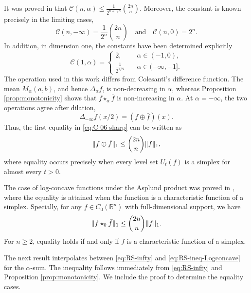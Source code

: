 \documentclass[11pt]{amsart}
\newcommand{\R}{{\mathbb R}}
\theoremstyle{plain}
\theoremstyle{definition}
\theoremstyle{remark}
\begin{document}
It was proved in  \cite{C-06} that
    $\mathcal{C} (n,\alpha) \leq \frac{1}{2^{n+1 / \alpha}}\binom{2 n}{n}.$
Moreover, the constant is known precisely in the limiting cases,
\begin{equation}
\label{eq:C-06-sharp}
\mathcal{C} (n,-\infty) = \frac{1}{2^n} \binom{2n}{n}\quad \text{and} \quad
\mathcal{C} (n,0) = 2^n.
\end{equation}
In addition, in dimension one, the constants have been determined explicitly
$$
   \mathcal{C} (1, \alpha)=
    \begin{cases}
        2,  & \quad \alpha \in(-1,0),
        \\
        \frac{1}{2^{1 / \alpha}} & \quad \alpha \in(-\infty,-1] .
    \end{cases}
$$
The operation used in this work differs from Colesanti's difference function. The mean $M_\alpha(a, b)$, and hence $\Delta_\alpha f$, is non-decreasing in $\alpha$, whereas Proposition \ref{prop:monotonicity} shows that $f \star_\alpha \bar f$ is non-increasing in $\alpha$. At $\alpha=-\infty$, the two operations agree after dilation,
$$
\Delta_{-\infty} f(x / 2)=(f \oplus \bar{f})(x) .
$$
Thus, the first equality in \eqref{eq:C-06-sharp} can be written as
\begin{equation}
    \label{eq:RS-infty}
    \| f \oplus \Bar{f} \|_1 \leq \binom{2n}{n} \| f\|_1,
\end{equation}
where equality occurs precisely when every level set $U_t(f)$ is a simplex for almost every $t > 0$.

The case of log-concave functions under the Asplund product was proved in \cite[Theorem~2.2]{AGJV-16}, where the equality is attained when the function is a characteristic function of a simplex. Specially, for any $f \in C_0(\R^n)$ with full-dimensional support, we have
\begin{equation}
    \label{eq:RS-ineq-Logconcave}
    \|f \star_0 \Bar{f} \|_1 \leq \binom{2n}{n} \|f\|_1.
\end{equation}
For $n\geq 2$, equality holds if and only if $f$ is a characteristic function of a simplex.

The next result interpolates between \eqref{eq:RS-infty} and \eqref{eq:RS-ineq-Logconcave} for the $\alpha$-sum. The inequality follows immediately from \eqref{eq:RS-infty} and Proposition \ref{prop:monotonicity}. We include the proof to determine the equality cases.

\RSAlphaSum*
\end{document}
